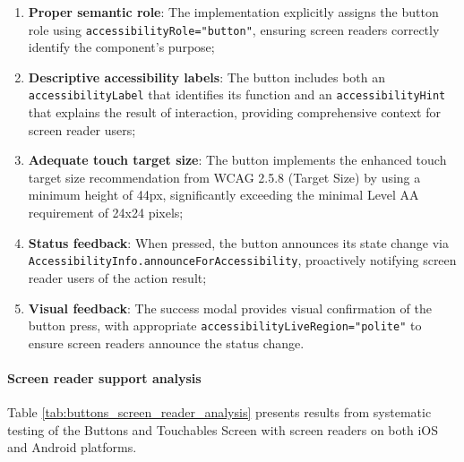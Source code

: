 \begin{enumerate}
    \item \textbf{Proper semantic role}: The implementation explicitly assigns the button role using \texttt{accessibilityRole="button"}, ensuring screen readers correctly identify the component's purpose;
    
    \item \textbf{Descriptive accessibility labels}: The button includes both an \texttt{accessibilityLabel} that identifies its function and an \texttt{accessibilityHint} that explains the result of interaction, providing comprehensive context for screen reader users;
    
    \item \textbf{Adequate touch target size}: The button implements the enhanced touch target size recommendation from WCAG 2.5.8 (Target Size) by using a minimum height of 44px, significantly exceeding the minimal Level AA requirement of 24x24 pixels;
    
    \item \textbf{Status feedback}: When pressed, the button announces its state change via \texttt{AccessibilityInfo.announceForAccessibility}, proactively notifying screen reader users of the action result;
    
    \item \textbf{Visual feedback}: The success modal provides visual confirmation of the button press, with appropriate \texttt{accessibilityLiveRegion="polite"} to ensure screen readers announce the status change.
\end{enumerate}

\paragraph{Screen reader support analysis}

Table \ref{tab:buttons_screen_reader_analysis} presents results from systematic testing of the Buttons and Touchables Screen with screen readers on both iOS and Android platforms.

